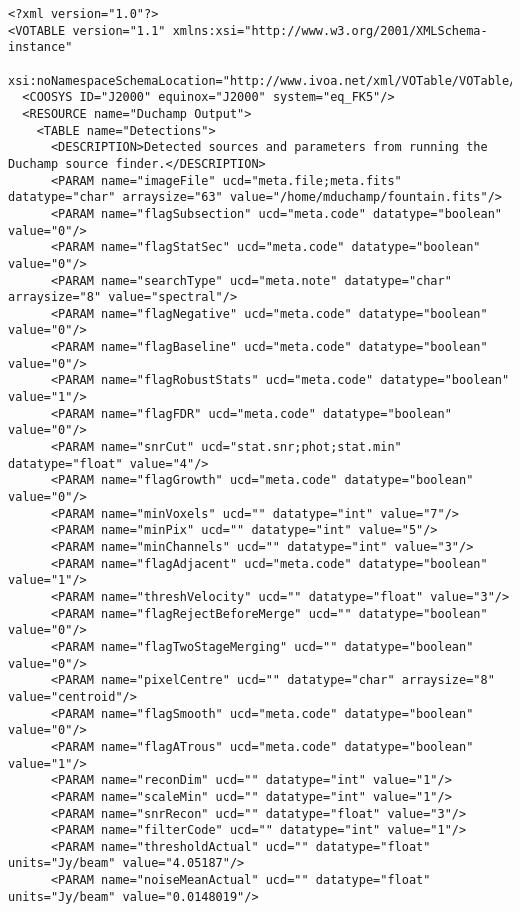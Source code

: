 {\tiny
  \begin{verbatim}
<?xml version="1.0"?>
<VOTABLE version="1.1" xmlns:xsi="http://www.w3.org/2001/XMLSchema-instance"
 xsi:noNamespaceSchemaLocation="http://www.ivoa.net/xml/VOTable/VOTable/v1.1">
  <COOSYS ID="J2000" equinox="J2000" system="eq_FK5"/>
  <RESOURCE name="Duchamp Output">
    <TABLE name="Detections">
      <DESCRIPTION>Detected sources and parameters from running the Duchamp source finder.</DESCRIPTION>
      <PARAM name="imageFile" ucd="meta.file;meta.fits" datatype="char" arraysize="63" value="/home/mduchamp/fountain.fits"/>
      <PARAM name="flagSubsection" ucd="meta.code" datatype="boolean" value="0"/>
      <PARAM name="flagStatSec" ucd="meta.code" datatype="boolean" value="0"/>
      <PARAM name="searchType" ucd="meta.note" datatype="char" arraysize="8" value="spectral"/>
      <PARAM name="flagNegative" ucd="meta.code" datatype="boolean" value="0"/>
      <PARAM name="flagBaseline" ucd="meta.code" datatype="boolean" value="0"/>
      <PARAM name="flagRobustStats" ucd="meta.code" datatype="boolean" value="1"/>
      <PARAM name="flagFDR" ucd="meta.code" datatype="boolean" value="0"/>
      <PARAM name="snrCut" ucd="stat.snr;phot;stat.min" datatype="float" value="4"/>
      <PARAM name="flagGrowth" ucd="meta.code" datatype="boolean" value="0"/>
      <PARAM name="minVoxels" ucd="" datatype="int" value="7"/>
      <PARAM name="minPix" ucd="" datatype="int" value="5"/>
      <PARAM name="minChannels" ucd="" datatype="int" value="3"/>
      <PARAM name="flagAdjacent" ucd="meta.code" datatype="boolean" value="1"/>
      <PARAM name="threshVelocity" ucd="" datatype="float" value="3"/>
      <PARAM name="flagRejectBeforeMerge" ucd="" datatype="boolean" value="0"/>
      <PARAM name="flagTwoStageMerging" ucd="" datatype="boolean" value="0"/>
      <PARAM name="pixelCentre" ucd="" datatype="char" arraysize="8" value="centroid"/>
      <PARAM name="flagSmooth" ucd="meta.code" datatype="boolean" value="0"/>
      <PARAM name="flagATrous" ucd="meta.code" datatype="boolean" value="1"/>
      <PARAM name="reconDim" ucd="" datatype="int" value="1"/>
      <PARAM name="scaleMin" ucd="" datatype="int" value="1"/>
      <PARAM name="snrRecon" ucd="" datatype="float" value="3"/>
      <PARAM name="filterCode" ucd="" datatype="int" value="1"/>
      <PARAM name="thresholdActual" ucd="" datatype="float" units="Jy/beam" value="4.05187"/>
      <PARAM name="noiseMeanActual" ucd="" datatype="float" units="Jy/beam" value="0.0148019"/>

\end{verbatim}}
